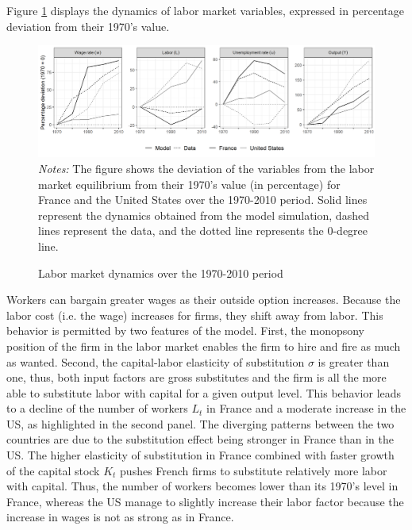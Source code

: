 Figure \ref{chap1-fig:quant-bench-dev7010-labor} displays the dynamics of labor market variables, expressed in percentage deviation from their 1970's value.
\begin{figure}[!tb]
	\centering
	\caption{Labor market dynamics over the 1970-2010 period} \label{chap1-fig:quant-bench-dev7010-labor}
	\includegraphics[width=1\linewidth]{chap1/graphic/quant-bench-dev7010-labor.png}
	\vspace{-3em}
	\justify\singlespacing\footnotesize\textit{Notes:} The figure shows the deviation of the variables from the labor market equilibrium from their 1970's value (in percentage) for France and the United States over the 1970-2010 period. Solid lines represent the dynamics obtained from the model simulation, dashed  lines represent the data, and the dotted line represents the 0-degree line.
\end{figure}
Workers can bargain greater wages as their outside option increases. Because the labor cost (i.e. the wage) increases for firms, they shift away from labor. This behavior is permitted by two features of the model. 
First, the monopsony position of the firm in the labor market enables the firm to hire and fire as much as wanted. 
Second, the capital-labor elasticity of substitution $\sigma$ is greater than one, thus, both input factors are gross substitutes and the firm is all the more able to substitute labor with capital for a given output level. This behavior leads to a decline of the number of workers $L_t$ in France and a moderate increase in the US, as highlighted in the second panel. The diverging patterns between the two countries are due to the substitution effect being stronger in France than in the US. The higher elasticity of substitution in France combined with faster growth of the capital stock $K_t$ pushes French firms to substitute relatively more labor with capital. Thus, the number of workers becomes lower than its 1970's level in France, whereas the US manage to slightly increase their labor factor because the increase in wages is not as strong as in France.


